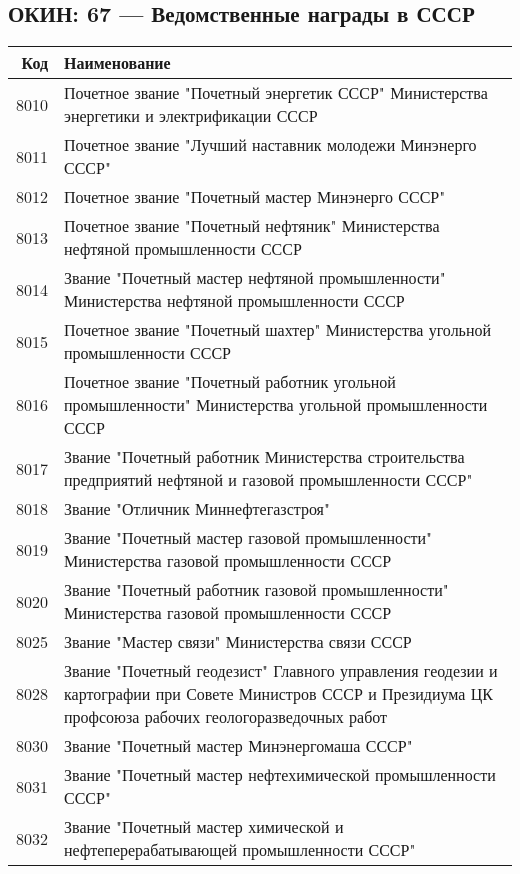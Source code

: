 \documentclass[10pt, a4paper, titlepage]{article}
\begin{document}
\subsection{ОКИН: 67 --- Ведомственные награды в СССР}

\begin{center}
    \begin{longtable}{rp{}}
        \hline
        \textbf{Код} & \textbf{Наименование} \\ \hline
        8010 & Почетное звание "Почетный энергетик СССР" Министерства энергетики и электрификации СССР \\
        8011 & Почетное звание "Лучший наставник молодежи Минэнерго СССР" \\
        8012 & Почетное звание "Почетный мастер Минэнерго СССР" \\
        8013 & Почетное звание "Почетный нефтяник" Министерства нефтяной промышленности СССР \\
        8014 & Звание "Почетный мастер нефтяной промышленности" Министерства нефтяной промышленности СССР \\
        8015 & Почетное звание "Почетный шахтер" Министерства угольной промышленности СССР \\
        8016 & Почетное звание "Почетный работник угольной промышленности" Министерства угольной промышленности СССР \\
        8017 & Звание "Почетный работник Министерства строительства предприятий нефтяной и газовой промышленности СССР" \\
        8018 & Звание "Отличник Миннефтегазстроя" \\
        8019 & Звание "Почетный мастер газовой промышленности" Министерства газовой промышленности СССР \\
        8020 & Звание "Почетный работник газовой промышленности" Министерства газовой промышленности СССР \\
        8025 & Звание "Мастер связи" Министерства связи СССР \\
        8028 & Звание "Почетный геодезист" Главного управления геодезии и картографии при Совете Министров СССР и Президиума ЦК профсоюза рабочих геологоразведочных работ \\
        8030 & Звание "Почетный мастер Минэнергомаша СССР" \\
        8031 & Звание "Почетный мастер нефтехимической промышленности СССР" \\
        8032 & Звание "Почетный мастер химической и нефтеперерабатывающей промышленности СССР" \\

\end{longtable}
\end{center}
\end{document}
